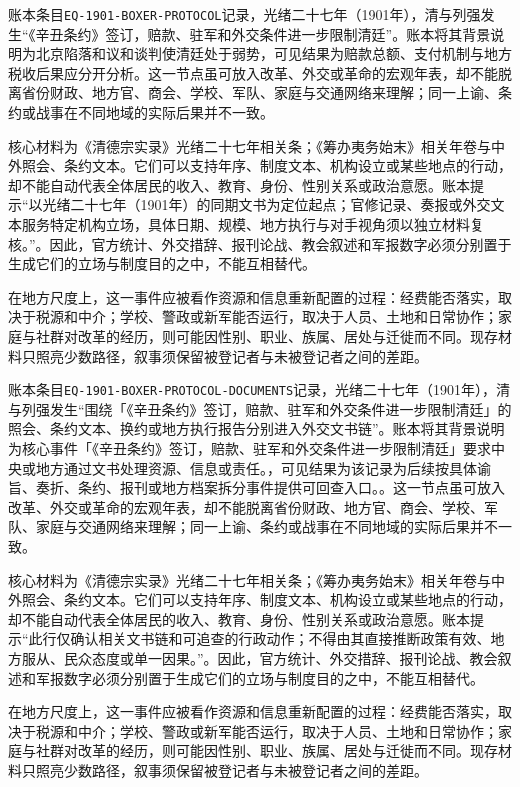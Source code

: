账本条目\texttt{EQ-1901-BOXER-PROTOCOL}记录，光绪二十七年（1901年），清与列强发生“《辛丑条约》签订，赔款、驻军和外交条件进一步限制清廷”。账本将其背景说明为北京陷落和议和谈判使清廷处于弱势，可见结果为赔款总额、支付机制与地方税收后果应分开分析。这一节点虽可放入改革、外交或革命的宏观年表，却不能脱离省份财政、地方官、商会、学校、军队、家庭与交通网络来理解；同一上谕、条约或战事在不同地域的实际后果并不一致。

核心材料为《清德宗实录》光绪二十七年相关条；《筹办夷务始末》相关年卷与中外照会、条约文本。它们可以支持年序、制度文本、机构设立或某些地点的行动，却不能自动代表全体居民的收入、教育、身份、性别关系或政治意愿。账本提示“以光绪二十七年（1901年）的同期文书为定位起点；官修记录、奏报或外交文本服务特定机构立场，具体日期、规模、地方执行与对手视角须以独立材料复核。”。因此，官方统计、外交措辞、报刊论战、教会叙述和军报数字必须分别置于生成它们的立场与制度目的之中，不能互相替代。

在地方尺度上，这一事件应被看作资源和信息重新配置的过程：经费能否落实，取决于税源和中介；学校、警政或新军能否运行，取决于人员、土地和日常协作；家庭与社群对改革的经历，则可能因性别、职业、族属、居处与迁徙而不同。现存材料只照亮少数路径，叙事须保留被登记者与未被登记者之间的差距。

账本条目\texttt{EQ-1901-BOXER-PROTOCOL-DOCUMENTS}记录，光绪二十七年（1901年），清与列强发生“围绕「《辛丑条约》签订，赔款、驻军和外交条件进一步限制清廷」的照会、条约文本、换约或地方执行报告分别进入外交文书链”。账本将其背景说明为核心事件「《辛丑条约》签订，赔款、驻军和外交条件进一步限制清廷」要求中央或地方通过文书处理资源、信息或责任。，可见结果为该记录为后续按具体谕旨、奏折、条约、报刊或地方档案拆分事件提供可回查入口。。这一节点虽可放入改革、外交或革命的宏观年表，却不能脱离省份财政、地方官、商会、学校、军队、家庭与交通网络来理解；同一上谕、条约或战事在不同地域的实际后果并不一致。

核心材料为《清德宗实录》光绪二十七年相关条；《筹办夷务始末》相关年卷与中外照会、条约文本。它们可以支持年序、制度文本、机构设立或某些地点的行动，却不能自动代表全体居民的收入、教育、身份、性别关系或政治意愿。账本提示“此行仅确认相关文书链和可追查的行政动作；不得由其直接推断政策有效、地方服从、民众态度或单一因果。”。因此，官方统计、外交措辞、报刊论战、教会叙述和军报数字必须分别置于生成它们的立场与制度目的之中，不能互相替代。

在地方尺度上，这一事件应被看作资源和信息重新配置的过程：经费能否落实，取决于税源和中介；学校、警政或新军能否运行，取决于人员、土地和日常协作；家庭与社群对改革的经历，则可能因性别、职业、族属、居处与迁徙而不同。现存材料只照亮少数路径，叙事须保留被登记者与未被登记者之间的差距。

